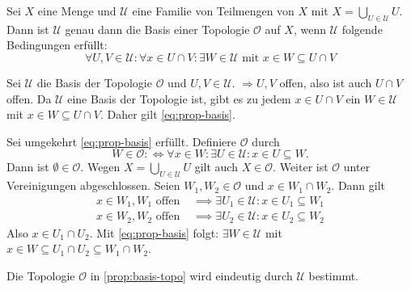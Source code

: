 \begin{proposition}[label=prop:basis-topo,{name=[Charakterisierung einer Basis der Topologie]}]
	Sei $X$ eine Menge und $\mathcal{U} $ eine Familie von Teilmengen von $X$ mit $X = \bigcup_{U \in \mathcal{U} } U$. 
	Dann ist $\mathcal{U}$ genau dann die Basis einer Topologie $\mathcal{O}$ auf $X$, wenn $\mathcal{U}$ folgende Bedingungen erfüllt:
	\begin{equation}
		\forall U,V \in \mathcal{U} : \forall x \in U \cap V : \exists W \in \mathcal{U}  \text{ mit } x \in W \subseteq U \cap V \label{eq:prop-basis} \tag{\#}
	\end{equation}
\end{proposition}
\begin{beweis}
	Sei $\mathcal{U} $ die Basis der Topologie $\mathcal{O} $ und $U,V \in \mathcal{U} $. $\Rightarrow U,V$ offen, also ist auch $U \cap V$ offen. 
	Da $\mathcal{U} $ eine Basis der Topologie ist, gibt es zu jedem $x \in U \cap V$ ein $W \in \mathcal{U} $ mit $x \in W \subseteq U \cap V$. Daher gilt \eqref{eq:prop-basis}. 
	
	Sei umgekehrt \eqref{eq:prop-basis} erfüllt. Definiere $\mathcal{O} $ durch
	\[
		W \in \mathcal{O} :\Longleftrightarrow \forall x \in W : \exists U \in \mathcal{U} : x \in U \subseteq W.  
	\]
	Dann ist $\emptyset \in \mathcal{O}$. 
	Wegen $X = \bigcup_{U \in \mathcal{U}} U$ gilt auch $X \in \mathcal{O}$. 
	Weiter ist $\mathcal{O}$ unter Vereinigungen abgeschlossen.
	Seien $W_1, W_2 \in \mathcal{O}$ und $x \in W_1 \cap W_2$. Dann gilt
	\begin{align*}
		x \in W_1, W_1 \text{ offen } &\implies  \exists U_1 \in \mathcal{U} : x \in U_1 \subseteq W_1 \\
		x \in W_2, W_2 \text{ offen } &\implies \exists U_2 \in \mathcal{U} : x \in U_2 \subseteq W_2 
	\end{align*}
	Also $x \in U_1 \cap U_2$. Mit \eqref{eq:prop-basis} folgt: $\exists W \in \mathcal{U} $ mit $x \in W \subseteq U_1 \cap U_2 \subseteq W_1 \cap W_2$.
\end{beweis}

\begin{bemerkung}[{name=[Eindeutigkeit der Topologie aus \cref{prop:basis-topo}]}]
	Die Topologie $\mathcal{O}$ in \cref{prop:basis-topo} wird eindeutig durch $\mathcal{U}$ bestimmt.
\end{bemerkung}

